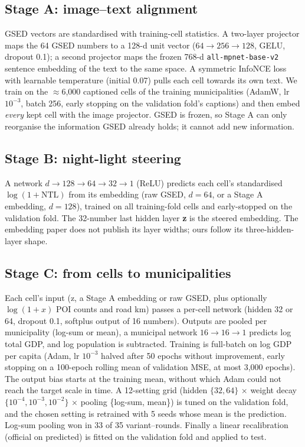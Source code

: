 \documentclass[11pt,a4paper]{article}
\begin{document}
\subsection{Stage A: image--text alignment}
GSED vectors are standardised with training-cell statistics. A two-layer projector maps the 64 GSED numbers to a
128-d unit vector ($64\to256\to128$, GELU, dropout 0.1); a second projector maps the frozen 768-d
\texttt{all-mpnet-base-v2} sentence embedding of the text to the same space. A symmetric InfoNCE loss with learnable
temperature (initial 0.07) pulls each cell towards its own text. We train on the $\approx$6{,}000 captioned cells of
the training municipalities (AdamW, lr $10^{-3}$, batch 256, early stopping on the validation fold's captions) and
then embed \emph{every} kept cell with the image projector. GSED is frozen, so Stage A can only reorganise the
information GSED already holds; it cannot add new information.

\subsection{Stage B: night-light steering}
A network $d\to128\to64\to32\to1$ (ReLU) predicts each cell's standardised $\log(1+\text{NTL})$ from its embedding
(raw GSED, $d=64$, or a Stage A embedding, $d=128$), trained on all training-fold cells and early-stopped on the
validation fold. The 32-number last hidden layer \textbf{z} is the steered embedding. The embedding paper does not
publish its layer widths; ours follow its three-hidden-layer shape.

\subsection{Stage C: from cells to municipalities}
Each cell's input (z, a Stage A embedding or raw GSED, plus optionally $\log(1+x)$ POI counts and road km) passes a
per-cell network (hidden 32 or 64, dropout 0.1, softplus output of 16 numbers). Outputs are pooled per municipality
(log-sum or mean), a municipal network $16\to16\to1$ predicts log total GDP, and log population is subtracted. Training
is full-batch on log GDP per capita (Adam, lr $10^{-3}$ halved after 50 epochs without improvement, early stopping on
a 100-epoch rolling mean of validation MSE, at most 3{,}000 epochs). The output bias starts at the training mean,
without which Adam could not reach the target scale in time. A 12-setting grid (hidden $\{32,64\}$ $\times$ weight
decay $\{10^{-4},10^{-3},10^{-2}\}$ $\times$ pooling \{log-sum, mean\}) is tuned on the validation fold, and the chosen
setting is retrained with 5 seeds whose mean is the prediction. Log-sum pooling won in 33 of 35 variant--rounds.
Finally a linear recalibration (official on predicted) is fitted on the validation fold and applied to test.
\end{document}

